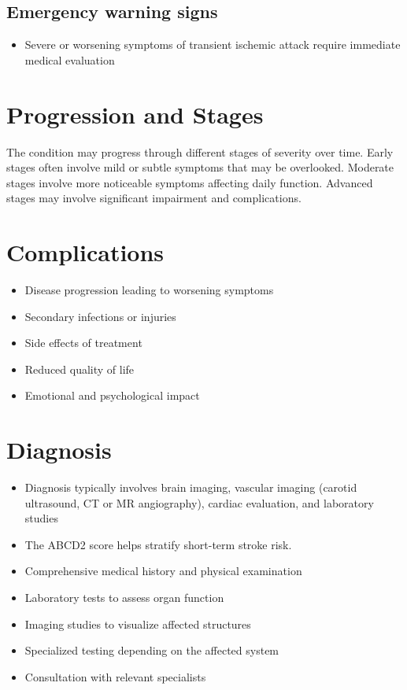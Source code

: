 \subsection{Emergency warning signs}
\begin{itemize}[noitemsep]
  \item Severe or worsening symptoms of transient ischemic attack require immediate medical evaluation
\end{itemize}
\section{Progression and Stages}
The condition may progress through different stages of severity over time. Early stages often involve mild or subtle symptoms that may be overlooked. Moderate stages involve more noticeable symptoms affecting daily function. Advanced stages may involve significant impairment and complications.
\section{Complications}
\begin{itemize}[noitemsep]
  \item Disease progression leading to worsening symptoms
  \item Secondary infections or injuries
  \item Side effects of treatment
  \item Reduced quality of life
  \item Emotional and psychological impact
\end{itemize}
\section{Diagnosis}
\begin{itemize}[noitemsep]
  \item Diagnosis typically involves brain imaging, vascular imaging (carotid ultrasound, CT or MR angiography), cardiac evaluation, and laboratory studies
  \item The ABCD2 score helps stratify short-term stroke risk.
  \item Comprehensive medical history and physical examination
  \item Laboratory tests to assess organ function
  \item Imaging studies to visualize affected structures
  \item Specialized testing depending on the affected system
  \item Consultation with relevant specialists
\end{itemize}
